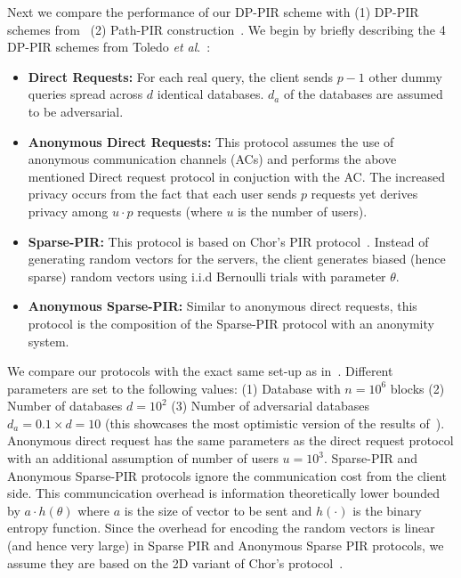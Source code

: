 \documentclass[USenglish,oneside,twocolumn]{article}
\makeatletter
\newcommand{\etal}{\textit{et al}.}
\let\origsubsection\subsection
\renewcommand\subsection{\@ifstar{\starsubsection}{\nostarsubsection}}
\newcommand\nostarsubsection[1]
{\subsectionprelude\origsubsection{#1}\subsectionpostlude}
\newcommand\starsubsection[1]
{\subsectionprelude\origsubsection*{#1}\subsectionpostlude}
\newcommand\subsectionprelude{\vspace{-1.5em}}
\newcommand\subsectionpostlude{\vspace{-1em}}
\makeatother
\begin{document}
\subsection{Comparison with Prior Work}\label{subsec:DPPIRcomparison}
Next we compare the performance of our DP-PIR scheme with (1) DP-PIR schemes from~\cite{goldbergDPPIR} (2) Path-PIR construction~\cite{mayberry2014efficient}. We begin by briefly describing the 4 DP-PIR schemes from Toledo \etal~\cite{goldbergDPPIR}:
\begin{itemize}[noitemsep, topsep=1pt]
\itemsep0em
\item \textbf{Direct Requests: }For each real query, the client sends $p-1$ other dummy queries spread across $d$ identical databases. $d_a$ of the databases are assumed to be adversarial.
\item \textbf{Anonymous Direct Requests: }This protocol assumes the use of anonymous communication channels (ACs) and performs the above mentioned Direct request protocol in conjuction with the AC. The increased privacy occurs from the fact that each user sends $p$ requests yet derives privacy among $u\cdot p$ requests (where $u$ is the number of users).
\item \textbf{Sparse-PIR: }This protocol is based on Chor's PIR protocol~\cite{chor}. Instead of generating random vectors for the servers, the client generates biased (hence sparse) random vectors using i.i.d Bernoulli trials with parameter $\theta$. 
\item \textbf{Anonymous Sparse-PIR: }Similar to anonymous direct requests, this protocol is the composition of the Sparse-PIR protocol with an anonymity system.\\
\end{itemize}

We compare our protocols with the exact same set-up as in~\cite{goldbergDPPIR}. Different parameters are set to the following values: (1) Database with $n = 10^6$ blocks (2) Number of databases $d = 10^2$ (3) Number of adversarial databases $d_a = 0.1 \times d = 10$ (this showcases the most optimistic version of the results of~\cite{goldbergDPPIR}). Anonymous direct request has the same parameters as the direct request protocol with an additional assumption of number of users $u = 10^3$. Sparse-PIR and Anonymous Sparse-PIR protocols ignore the communication cost from the client side. This communcication overhead is information theoretically lower bounded by $a\cdot h(\theta)$ where $a$ is the size of vector to be sent and $h(\cdot)$ is the binary entropy function. Since the overhead for encoding the random vectors is linear (and hence very large) in Sparse PIR and Anonymous Sparse PIR protocols, we assume they are based on the 2D variant of Chor's protocol~\cite{chor}. 
\end{document}

